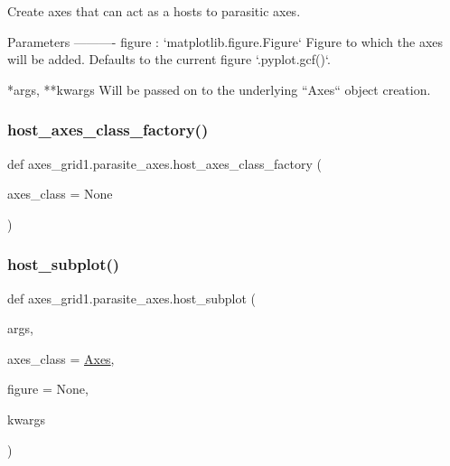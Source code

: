 \begin{DoxyVerb}Create axes that can act as a hosts to parasitic axes.

Parameters
----------
figure : `matplotlib.figure.Figure`
    Figure to which the axes will be added. Defaults to the current figure
    `.pyplot.gcf()`.

*args, **kwargs
    Will be passed on to the underlying ``Axes`` object creation.
\end{DoxyVerb}
 \mbox{\label{namespaceaxes__grid1_1_1parasite__axes_aad2a9feccd8adae93416c70588325451}} 
\subsubsection{\texorpdfstring{host\+\_\+axes\+\_\+class\+\_\+factory()}{host\_axes\_class\_factory()}}
{\footnotesize\ttfamily def axes\+\_\+grid1.\+parasite\+\_\+axes.\+host\+\_\+axes\+\_\+class\+\_\+factory (\begin{DoxyParamCaption}\item[{}]{axes\+\_\+class = {\ttfamily None} }\end{DoxyParamCaption})}

\mbox{\label{namespaceaxes__grid1_1_1parasite__axes_ac26bf18eb14953db43a73ee0e9d9e096}} 
\subsubsection{\texorpdfstring{host\+\_\+subplot()}{host\_subplot()}}
{\footnotesize\ttfamily def axes\+\_\+grid1.\+parasite\+\_\+axes.\+host\+\_\+subplot (\begin{DoxyParamCaption}\item[{}]{args,  }\item[{}]{axes\+\_\+class = {\ttfamily \hyperlink{classaxes__grid1_1_1mpl__axes_1_1Axes}{Axes}},  }\item[{}]{figure = {\ttfamily None},  }\item[{}]{kwargs }\end{DoxyParamCaption})}

